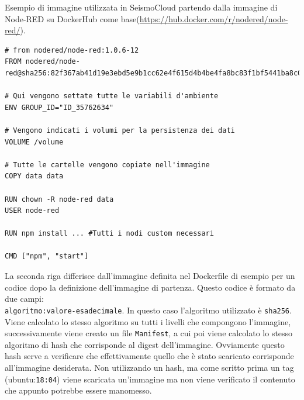 \documentclass[a4paper,10pt]{memoir}
\begin{document}
\vspace{0.02\textwidth}
\begin{center}
Esempio di immagine utilizzata in SeismoCloud partendo dalla immagine di Node-RED su DockerHub come base(\href{https://hub.docker.com/r/nodered/node-red/}{https://hub.docker.com/r/nodered/node-red/}).
\end{center}

\begin{lstlisting}[language=docker]
# from nodered/node-red:1.0.6-12
FROM nodered/node-red@sha256:82f367ab41d19e3ebd5e9b1cc62e4f615d4b4be4fa8bc83f1bf5441ba8c0d32a

# Qui vengono settate tutte le variabili d'ambiente
ENV GROUP_ID="ID_35762634"

# Vengono indicati i volumi per la persistenza dei dati
VOLUME /volume

# Tutte le cartelle vengono copiate nell'immagine
COPY data data

RUN chown -R node-red data
USER node-red

RUN npm install ... #Tutti i nodi custom necessari

CMD ["npm", "start"]
\end{lstlisting}
La seconda riga differisce dall'immagine definita nel Dockerfile di esempio per un codice dopo la definizione dell'immagine di partenza.
Questo codice è formato da due campi:\\ \texttt{algoritmo:valore-esadecimale}.
In questo caso l'algoritmo utilizzato è \texttt{sha256}. Viene calcolato lo stesso algoritmo su tutti i livelli che compongono l'immagine, successivamente viene creato un file \texttt{Manifest}, a cui poi viene calcolato lo stesso algoritmo di hash che corrisponde al digest dell'immagine. Ovviamente questo hash serve a verificare che effettivamente quello che è stato scaricato corrisponde all'immagine desiderata. Non utilizzando un hash, ma come scritto prima un tag (ubuntu:\texttt{18:04}) viene scaricata un'immagine ma non viene verificato il contenuto che appunto potrebbe essere manomesso. 
\end{document}

